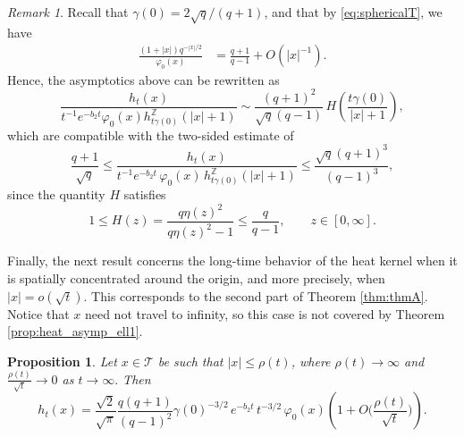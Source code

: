 \documentclass[11pt,a4paper,reqno]{amsart}
\renewcommand\mathcal{\mathscr}
\theoremstyle{plain}
\newtheorem{proposition}[theorem]{Proposition}
\theoremstyle{remark}
\newtheorem{remark}[theorem]{Remark}
\theoremstyle{definition}
\theoremstyle{remark}
\numberwithin{equation}{section}
\begin{document}
\begin{remark} Recall that $\gamma(0)=2\sqrt{q}/(q+1)$, and that by \eqref{eq:sphericalT}, we have
	\begin{align}\label{eq:phi0_asympt}
	\frac{(1+|x|)q^{-|x|/2}}{\varphi_0(x)}&=\frac{q+1}{q-1}+O(|x|^{-1}).
	\end{align}
Hence, the asymptotics above can be rewritten as
$$\frac{h_t(x)}
{t^{-1}e^{-b_2t}\varphi_0(x)
h_{t\gamma(0)}^{\mathbb Z}(|x|+1)}
\sim
\frac{(q+1)^2}{\sqrt q (q-1)}\,
H\left(\frac{t\gamma(0)}{|x|+1}\right),$$
which are compatible with the two-sided estimate of 
\cite[Proposition 2.5]{CMS} 	\begin{equation*}
\frac{q+1}{\sqrt{q}}\leq	\frac{h_t(x)}{t^{-1}{e^{-b_2t}}\, \varphi_0(x)\, h_{t\gamma(0)}^{\mathbb{Z}}(|x|+1) }\leq 
	\frac{\sqrt{q}(q+1)^3}{(q-1)^3},
    \end{equation*}
    since the quantity $H$ satisfies
\[
1
\leq
H(z)=\frac{q\eta(z)^2}{q\eta(z)^2-1}
\leq
\frac{q}{q-1},
\qquad z\in[0,\infty].
\]
\end{remark}
	
	\bigskip
	
	
	
	Finally, the next result concerns the long-time behavior of the heat kernel when it is spatially concentrated around the origin, and more precisely, when $|x| = o(\sqrt{t})$. This corresponds to the second part of Theorem \ref{thm:thmA}. Notice that $x$ need not travel to infinity, so this case is not covered by Theorem \ref{prop:heat_asymp_ell1}.
	
	\begin{proposition}\label{prop:heat_asymp_p>2} Let $x\in \mathcal{T}$ be such that $|x|\leq \rho(t)$, where $\rho(t)\to \infty$ and   $\frac{\rho(t)}{\sqrt{t}}\to 0$ as $t\to \infty.$
		Then
		\[
		h_t(x)=\frac{\sqrt{2}}{\sqrt{\pi}}\frac{q(q+1)}{(q-1)^2}\gamma(0)^{-3/2}\, e^{-b_2t}\,t^{-3/2}\, \varphi_0(x)\left(1+O\Big(\frac{\rho(t)}{\sqrt{t}}\Big)\right). 
		\]
	\end{proposition}
	
\end{document}
